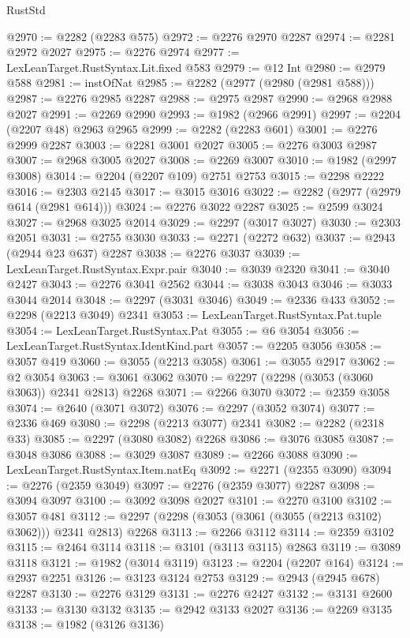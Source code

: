 \begin{lexlean}{RustStd}
\begin{coremodule}
{\begin{coremodule}
{{{{{{{{{{{{{{{{{{{{{{{{{{{{{{{{{{{{{{{{{{{{{{{{{{{{{{@2970 := @2282 (@2283 @575)
@2972 := @2276 @2970 @2287
@2974 := @2281 @2972 @2027
@2975 := @2276 @2974
@2977 := LexLeanTarget.RustSyntax.Lit.fixed @583
@2979 := @12 Int
@2980 := @2979 @588
@2981 := instOfNat
@2985 := @2282 (@2977 (@2980 (@2981 @588)))
@2987 := @2276 @2985 @2287
@2988 := @2975 @2987
@2990 := @2968 @2988 @2027
@2991 := @2269 @2990
@2993 := @1982 (@2966 @2991)
@2997 := @2204 (@2207 @48) @2963 @2965
@2999 := @2282 (@2283 @601)
@3001 := @2276 @2999 @2287
@3003 := @2281 @3001 @2027
@3005 := @2276 @3003 @2987
@3007 := @2968 @3005 @2027
@3008 := @2269 @3007
@3010 := @1982 (@2997 @3008)
@3014 := @2204 (@2207 @109) @2751 @2753
@3015 := @2298 @2222
@3016 := @2303 @2145
@3017 := @3015 @3016
@3022 := @2282 (@2977 (@2979 @614 (@2981 @614)))
@3024 := @2276 @3022 @2287
@3025 := @2599 @3024
@3027 := @2968 @3025 @2014
@3029 := @2297 (@3017 @3027)
@3030 := @2303 @2051
@3031 := @2755 @3030
@3033 := @2271 (@2272 @632)
@3037 := @2943 (@2944 @23 @637) @2287
@3038 := @2276 @3037
@3039 := LexLeanTarget.RustSyntax.Expr.pair
@3040 := @3039 @2320
@3041 := @3040 @2427
@3043 := @2276 @3041 @2562
@3044 := @3038 @3043
@3046 := @3033 @3044 @2014
@3048 := @2297 (@3031 @3046)
@3049 := @2336 @433
@3052 := @2298 (@2213 @3049) @2341
@3053 := LexLeanTarget.RustSyntax.Pat.tuple
@3054 := LexLeanTarget.RustSyntax.Pat
@3055 := @6 @3054
@3056 := LexLeanTarget.RustSyntax.IdentKind.part
@3057 := @2205 @3056
@3058 := @3057 @419
@3060 := @3055 (@2213 @3058)
@3061 := @3055 @2917
@3062 := @2 @3054
@3063 := @3061 @3062
@3070 := @2297 (@2298 (@3053 (@3060 @3063)) @2341 @2813) @2268
@3071 := @2266 @3070
@3072 := @2359 @3058
@3074 := @2640 (@3071 @3072)
@3076 := @2297 (@3052 @3074)
@3077 := @2336 @469
@3080 := @2298 (@2213 @3077) @2341
@3082 := @2282 (@2318 @33)
@3085 := @2297 (@3080 @3082) @2268
@3086 := @3076 @3085
@3087 := @3048 @3086
@3088 := @3029 @3087
@3089 := @2266 @3088
@3090 := LexLeanTarget.RustSyntax.Item.natEq
@3092 := @2271 (@2355 @3090)
@3094 := @2276 (@2359 @3049)
@3097 := @2276 (@2359 @3077) @2287
@3098 := @3094 @3097
@3100 := @3092 @3098 @2027
@3101 := @2270 @3100
@3102 := @3057 @481
@3112 := @2297 (@2298 (@3053 (@3061 (@3055 (@2213 @3102) @3062))) @2341 @2813) @2268
@3113 := @2266 @3112
@3114 := @2359 @3102
@3115 := @2464 @3114
@3118 := @3101 (@3113 @3115) @2863
@3119 := @3089 @3118
@3121 := @1982 (@3014 @3119)
@3123 := @2204 (@2207 @164)
@3124 := @2937 @2251
@3126 := @3123 @3124 @2753
@3129 := @2943 (@2945 @678) @2287
@3130 := @2276 @3129
@3131 := @2276 @2427
@3132 := @3131 @2600
@3133 := @3130 @3132
@3135 := @2942 @3133 @2027
@3136 := @2269 @3135
@3138 := @1982 (@3126 @3136)
}}}}}}}}}}}}}}}}}}}}}}}}}}}}}}}}}}}}}}}}}}}}}}}}}}}}}}
\end{coremodule}}
\end{coremodule}
\end{lexlean}
